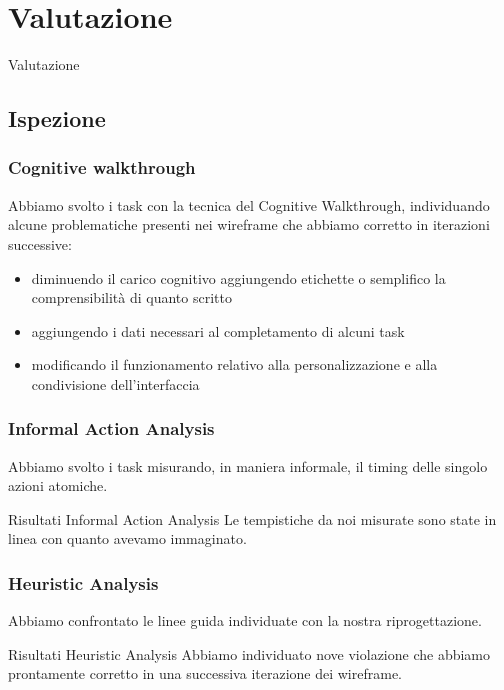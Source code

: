 \documentclass[handout]{beamer}
\begin{document}
	\section{Valutazione}
		\begin{frame}
			\centering
			\begin{Huge}
				Valutazione
			\end{Huge}
		\end{frame}
		\subsection{Ispezione}
		\begin{frame}
			\frametitle{Cognitive walkthrough}
			Abbiamo svolto i task con la tecnica del Cognitive Walkthrough, individuando alcune problematiche presenti nei wireframe che abbiamo corretto in iterazioni successive:
			\begin{itemize}[<+->]
				\item diminuendo il carico cognitivo aggiungendo etichette o semplifico la comprensibilità di quanto scritto\\
				\item aggiungendo i dati necessari al completamento di alcuni task\\
				\item modificando il funzionamento relativo alla personalizzazione e alla condivisione dell'interfaccia\\
			\end{itemize}
		\end{frame}

		\begin{frame}
			\frametitle{Informal Action Analysis}
			Abbiamo svolto i task misurando, in maniera informale, il timing delle singolo azioni atomiche. \newline \newline
			\begin{block}{Risultati Informal Action Analysis}
			Le tempistiche da noi misurate sono state in linea con quanto avevamo immaginato.
		\end{block}
		\end{frame}

		\begin{frame}
			\frametitle{Heuristic Analysis}
			Abbiamo confrontato le linee guida individuate con la nostra riprogettazione. \newline \newline
			\begin{block}{Risultati Heuristic Analysis}
				Abbiamo individuato nove violazione che abbiamo prontamente corretto in una successiva iterazione dei wireframe.
		\end{block}
		\end{frame}
\end{document}
